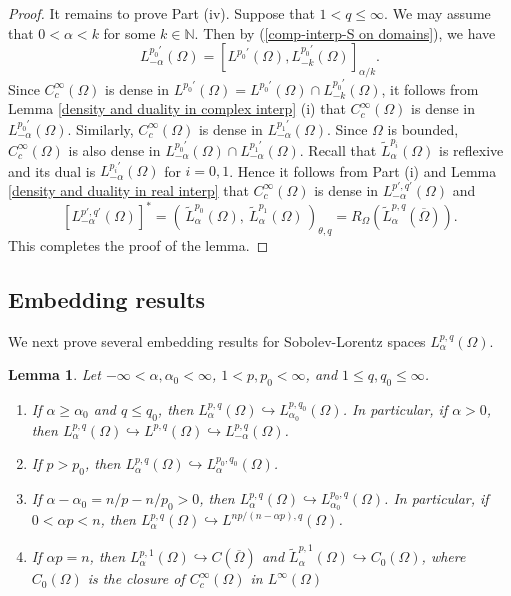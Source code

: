\documentclass[reqno,centertags,11pt]{amsart}
\newtheorem{lem}[thm]{Lemma}
\theoremstyle{definition}
\numberwithin{thm}{section}
\numberwithin{equation}{section}
\newcommand{\N}{{\mathbb{N}}}
\begin{document}
\begin{proof}
It remains to prove Part (iv).
Suppose that $1<q \le \infty$. We may assume that $0<\alpha < k$ for some  $k \in \N$.  Then by (\ref{comp-interp-S on domains}), we have
\[
L_{-\alpha}^{p_0 '} (\Omega )  =   \left[ L^{p_0'} (\Omega ) ,L_{-k}^{p_0 '} (\Omega ) \right]_{\alpha /k} .
\]
Since $C_c^\infty (\Omega )$ is dense in $L^{p_0'} (\Omega ) = L^{p_0'} (\Omega ) \cap L_{-k}^{p_0 '} (\Omega )$, it follows from Lemma \ref{density and duality in complex interp} (i) that
$C_c^\infty (\Omega )$ is dense in
 $L_{-\alpha}^{p_0 '} (\Omega )$. Similarly, $C_c^\infty (\Omega )$ is dense in  $   L_{-\alpha}^{p_1 '} (\Omega )$.
Since $\Omega$ is bounded, $C_c^\infty (\Omega )$ is also dense in  $ L_{-\alpha}^{p_0 '} (\Omega )\cap   L_{-\alpha}^{p_1 '} (\Omega )$.   Recall that $\widetilde{L}_\alpha^{p_i}(\Omega )$ is reflexive and its dual is    $L_{-\alpha}^{p_i'}(\Omega )$ for $i=0,1$.
Hence it follows from Part (i)  and   Lemma \ref{density and duality in real interp} that $C_c^\infty (\Omega )$ is dense in $L_{-\alpha}^{p',q'} (\Omega ) $ and
\[
 \left[ L_{-\alpha}^{p', q'}(\Omega ) \right]^* =   \left(\,    \widetilde{L}_{\alpha}^{p_0 }(\Omega )   , \ \widetilde{L}_{\alpha}^{p_1}(\Omega )   \, \right)_{\theta,q} = R_\Omega  (\widetilde{L}_\alpha^{p,q} (\overline{\Omega} ) ) .
\]
This completes the proof of the lemma.
\end{proof}





\subsection{Embedding  results}


We next prove several embedding results for Sobolev-Lorentz spaces $L_{\alpha}^{p,q} (\Omega )$.

\begin{lem}\label{properties of SL on domains} Let $-\infty < \alpha, \alpha_0 <\infty$, $1< p, p_0 <\infty$, and $ 1\le q ,q_0 \le \infty$.
\begin{enumerate}[{\upshape (i)}]
\item  If $\alpha  \ge \alpha_0$  and $q \le q_0 $, then   $L_\alpha^{p,q}(\Omega ) \hookrightarrow L_{\alpha_0}^{p,q_0 }(\Omega ) $. In particular, if $\alpha > 0$, then $L_\alpha^{p,q}(\Omega ) \hookrightarrow L^{p,q  }(\Omega )\hookrightarrow L_{-\alpha}^{p,q}(\Omega )$.
\item  If  $p >  p_0$,  then    $L_\alpha^{p,q}(\Omega ) \hookrightarrow L_{\alpha}^{p_0,q_0 }(\Omega ) $.
\item    If $\alpha-\alpha_0 = n/p-n/p_0 >0$, then $L_\alpha^{p,q}(\Omega )\hookrightarrow L_{\alpha_0}^{p_0 , q}(\Omega )$. In particular,  if $0<  \alpha p < n $, then $L_\alpha^{p,q}(\Omega)\hookrightarrow L^{np/(n-\alpha p),q}(\Omega)$.
\item     If $\alpha p=n$, then $L_\alpha^{p,1}(\Omega)\hookrightarrow C  (\overline{\Omega} )$ and $\widetilde{L}_\alpha^{p,1}(\Omega)\hookrightarrow C_0  (\Omega )$, where $C_0 (\Omega )$ is the closure of $C_c^\infty (\Omega )$ in $L^\infty (\Omega)$
\end{enumerate}
\end{lem}
\end{document}
